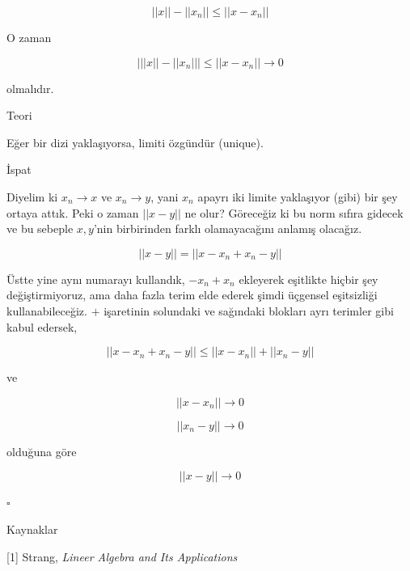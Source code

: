 \documentclass[12pt,fleqn]{article}\usepackage{../../common}
\begin{document}
$$ ||x||  - ||x_n|| \le ||x-x_n|| $$

O zaman 

$$ \bigg| ||x||  - ||x_n|| \bigg|  \le ||x-x_n|| \to 0$$

olmalıdır. 

Teori 

Eğer bir dizi yaklaşıyorsa, limiti özgündür (unique).

İspat

Diyelim ki $x_n \to x$ ve $x_n \to y$, yani $x_n$ apayrı iki limite
yaklaşıyor (gibi) bir şey ortaya attık. Peki o zaman $||x-y||$ ne olur?
Göreceğiz ki bu norm sıfıra gidecek ve bu sebeple $x,y$'nin birbirinden
farklı olamayacağını anlamış olacağız. 

$$ ||x-y|| =  ||x-x_n + x_n-y|| $$

Üstte yine aynı numarayı kullandık, $-x_n+x_n$ ekleyerek eşitlikte hiçbir
şey değiştirmiyoruz, ama daha fazla terim elde ederek şimdi üçgensel
eşitsizliği kullanabileceğiz. $+$ işaretinin solundaki ve sağındaki
blokları ayrı terimler gibi kabul edersek, 

$$ ||x-x_n + x_n-y|| \le ||x-x_n || + ||x_n-y|| $$

ve

$$ ||x-x_n || \to 0 $$

$$ ||x_n-y|| \to 0$$

olduğuna göre 

$$  ||x-y|| \to 0 $$ 

$\square$

Kaynaklar

[1] Strang, {\em Lineer Algebra and Its Applications}
\end{document}
